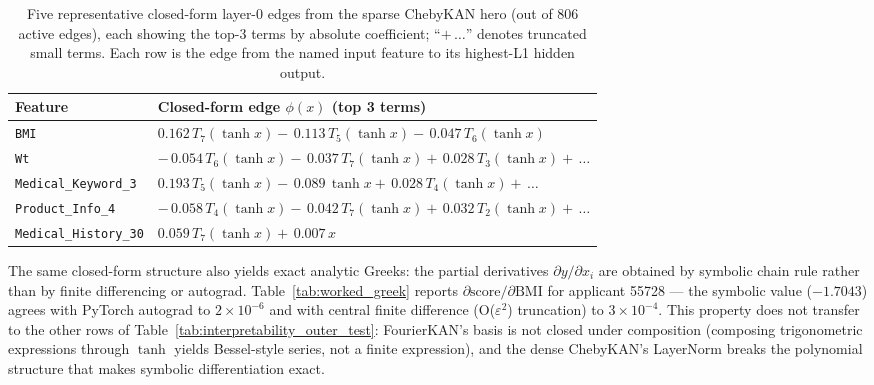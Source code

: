 \begin{table}[H]
\centering
\caption{Five representative closed-form layer-0 edges from the sparse ChebyKAN hero (out of 806 active edges), each showing the top-3 terms by absolute coefficient; ``$+\,\dots$'' denotes truncated small terms. Each row is the edge from the named input feature to its highest-L1 hidden output.}
\label{tab:closed_forms}
\footnotesize
\begin{tabular}{ll}
\hline
Feature & Closed-form edge $\phi(x)$ (top 3 terms) \\
\hline
\texttt{BMI} & $\displaystyle 0.162\,T_{7}(\tanh x) -\,0.113\,T_{5}(\tanh x) -\,0.047\,T_{6}(\tanh x)$ \\
\texttt{Wt} & $\displaystyle -\,0.054\,T_{6}(\tanh x) -\,0.037\,T_{7}(\tanh x) +\,0.028\,T_{3}(\tanh x) +\,\dots$ \\
\texttt{Medical\_Keyword\_3} & $\displaystyle 0.193\,T_{5}(\tanh x) -\,0.089\,\tanh x +\,0.028\,T_{4}(\tanh x) +\,\dots$ \\
\texttt{Product\_Info\_4} & $\displaystyle -\,0.058\,T_{4}(\tanh x) -\,0.042\,T_{7}(\tanh x) +\,0.032\,T_{2}(\tanh x) +\,\dots$ \\
\texttt{Medical\_History\_30} & $\displaystyle 0.059\,T_{7}(\tanh x) +\,0.007\,x$ \\
\hline
\end{tabular}
\end{table}

The same closed-form structure also yields exact analytic Greeks:
the partial derivatives $\partial y / \partial x_i$ are obtained by
symbolic chain rule rather than by finite differencing or autograd.
Table~\ref{tab:worked_greek} reports $\partial \text{score} /
\partial \text{BMI}$ for applicant 55728 --- the symbolic value
($-1.7043$) agrees with PyTorch autograd to $2 \times 10^{-6}$ and
with central finite difference (O($\varepsilon^2$) truncation) to
$3 \times 10^{-4}$. This property does not transfer to the other
rows of Table~\ref{tab:interpretability_outer_test}: FourierKAN's
basis is not closed under composition (composing trigonometric
expressions through $\tanh$ yields Bessel-style series, not a finite
expression), and the dense ChebyKAN's LayerNorm breaks the
polynomial structure that makes symbolic differentiation exact.

